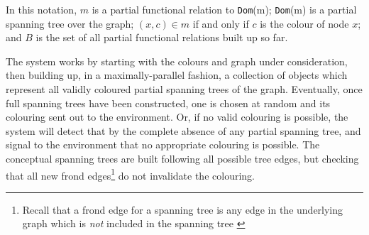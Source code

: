 \begin{algorithm}
\DontPrintSemicolon
{}

\hrulefill

\caption[Pseudocode representation of the algorithm performed by the \glspl{cps} rules in \cref{ruleset:gcol:rules}]{\label{code:gcol:graphcol}Pseudocode representation of the algorithm performed by the \glspl{cps} rules in \cref{ruleset:gcol:rules}.  This employs a doubly defined tail-recursive function approach, where the algorithm begins with the upper function supplied only with the details of the graph and colours, but uses the lower function with further arguments to perform most of the processing.}
\end{algorithm}

In this notation, \(m\) is a partial functional relation to \texttt{Dom}(m); \texttt{Dom}(m) is a partial spanning tree over the graph; \((x, c) \in m\) if and only if \(c\) is the colour of node \(x\);  and \(B\) is the set of all partial functional relations built up so far.

The system works by starting with the colours and graph under consideration, then building up, in a maximally-parallel fashion, a collection of objects which represent all validly coloured partial spanning trees of the graph.  Eventually, once full spanning trees have been constructed, one is chosen at random and its colouring sent out to the environment.  Or, if no valid colouring is possible, the system will detect that by the complete absence of any partial spanning tree, and signal to the environment that no appropriate colouring is possible.  The conceptual spanning trees are built following all possible tree edges, but checking that all new frond edges\footnote{Recall that a frond edge for a spanning tree is any edge in the underlying graph which is \emph{not} included in the spanning tree \cite{Erciyes2013}} do not invalidate the colouring.

